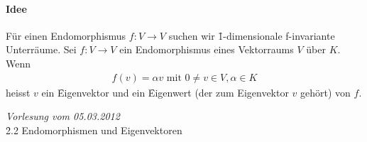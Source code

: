 \paragraph{Idee} Für einen Endomorphismus $f: V \rightarrow V$ suchen wir \f{1-dimensionale f-invariante Unterräume}.
Sei $f: V \rightarrow V$ ein Endomorphismus eines Vektorraums $V$ über $K$. Wenn
\begin{align}
f(v) = \alpha v \text{ mit }0 \neq v \in V, \alpha \in K
\end{align}
heisst $v$ ein \f{Eigenvektor}  und ein \f{Eigenwert} (der zum Eigenvektor $v$ gehört) von $f$.

\newpage
\noindent \textit{Vorlesung vom 05.03.2012} \\
\noindent \f{2.2 Endomorphismen und Eigenvektoren} \\

